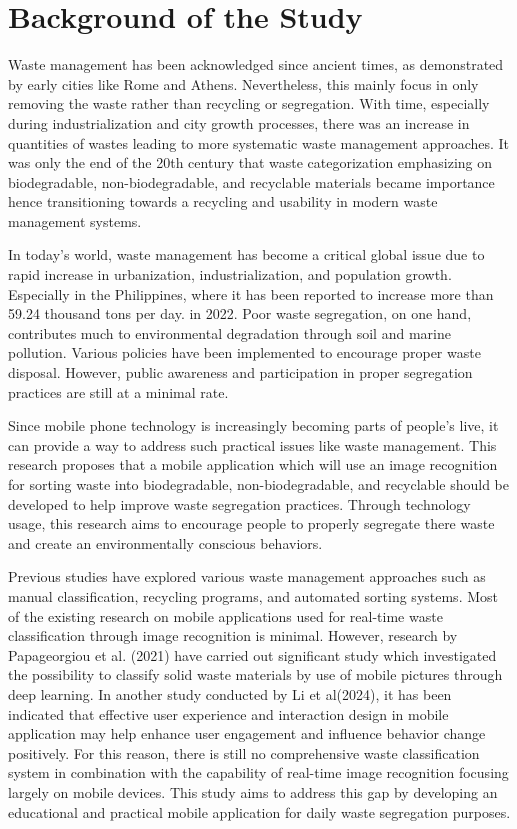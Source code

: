 \section{Background of the Study}
Waste management has been acknowledged since ancient times, as demonstrated by early cities like Rome and Athens. Nevertheless, this mainly focus in only removing the waste rather than recycling or segregation. With time, especially during industrialization and city growth processes, there was an increase in quantities of wastes leading to more systematic waste management approaches. It was only the end of the 20th century that waste categorization emphasizing on biodegradable, non-biodegradable, and recyclable materials became importance hence transitioning towards a recycling and usability in modern waste management systems.

In today's world, waste management has become a critical global issue due to rapid increase in urbanization, industrialization, and population growth. Especially in the Philippines, where it has been reported to increase more than 59.24 thousand tons per day. in 2022. Poor waste segregation, on one hand, contributes much to environmental degradation through soil and marine pollution. Various policies have been implemented to encourage proper waste disposal. However, public awareness and participation in proper segregation practices are still at a minimal rate.

Since mobile phone technology is increasingly becoming parts of people's live, it can provide a way to address such practical issues like waste management. This research proposes that a mobile application which will use an image recognition for sorting waste into biodegradable, non-biodegradable, and recyclable should be developed to help improve waste segregation practices. Through technology usage, this research aims to encourage people to properly segregate there waste and create an environmentally conscious behaviors.

Previous studies have explored various waste management approaches such as manual classification, recycling programs, and automated sorting systems. Most of the existing research on mobile applications used for real-time waste classification through image recognition is minimal. However, research by Papageorgiou et al. (2021) have carried out significant study which investigated the possibility to classify solid waste materials by use of mobile pictures through deep learning. In another study conducted by Li et al(2024), it has been indicated that effective user experience and interaction design in mobile application may help enhance user engagement and influence behavior change positively. For this reason, there is still no comprehensive waste classification system in combination with the capability of real-time image recognition focusing largely on mobile devices. This study aims to address this gap by developing an educational and practical mobile application for daily waste segregation purposes.